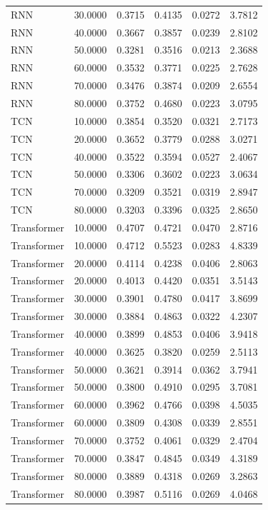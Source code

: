 \begin{tabular}{lrrrrr}
RNN & 30.0000 & 0.3715 & 0.4135 & 0.0272 & 3.7812 \\
RNN & 40.0000 & 0.3667 & 0.3857 & 0.0239 & 2.8102 \\
RNN & 50.0000 & 0.3281 & 0.3516 & 0.0213 & 2.3688 \\
RNN & 60.0000 & 0.3532 & 0.3771 & 0.0225 & 2.7628 \\
RNN & 70.0000 & 0.3476 & 0.3874 & 0.0209 & 2.6554 \\
RNN & 80.0000 & 0.3752 & 0.4680 & 0.0223 & 3.0795 \\
TCN & 10.0000 & 0.3854 & 0.3520 & 0.0321 & 2.7173 \\
TCN & 20.0000 & 0.3652 & 0.3779 & 0.0288 & 3.0271 \\
TCN & 40.0000 & 0.3522 & 0.3594 & 0.0527 & 2.4067 \\
TCN & 50.0000 & 0.3306 & 0.3602 & 0.0223 & 3.0634 \\
TCN & 70.0000 & 0.3209 & 0.3521 & 0.0319 & 2.8947 \\
TCN & 80.0000 & 0.3203 & 0.3396 & 0.0325 & 2.8650 \\
Transformer & 10.0000 & 0.4707 & 0.4721 & 0.0470 & 2.8716 \\
Transformer & 10.0000 & 0.4712 & 0.5523 & 0.0283 & 4.8339 \\
Transformer & 20.0000 & 0.4114 & 0.4238 & 0.0406 & 2.8063 \\
Transformer & 20.0000 & 0.4013 & 0.4420 & 0.0351 & 3.5143 \\
Transformer & 30.0000 & 0.3901 & 0.4780 & 0.0417 & 3.8699 \\
Transformer & 30.0000 & 0.3884 & 0.4863 & 0.0322 & 4.2307 \\
Transformer & 40.0000 & 0.3899 & 0.4853 & 0.0406 & 3.9418 \\
Transformer & 40.0000 & 0.3625 & 0.3820 & 0.0259 & 2.5113 \\
Transformer & 50.0000 & 0.3621 & 0.3914 & 0.0362 & 3.7941 \\
Transformer & 50.0000 & 0.3800 & 0.4910 & 0.0295 & 3.7081 \\
Transformer & 60.0000 & 0.3962 & 0.4766 & 0.0398 & 4.5035 \\
Transformer & 60.0000 & 0.3809 & 0.4308 & 0.0339 & 2.8551 \\
Transformer & 70.0000 & 0.3752 & 0.4061 & 0.0329 & 2.4704 \\
Transformer & 70.0000 & 0.3847 & 0.4845 & 0.0349 & 4.3189 \\
Transformer & 80.0000 & 0.3889 & 0.4318 & 0.0269 & 3.2863 \\
Transformer & 80.0000 & 0.3987 & 0.5116 & 0.0269 & 4.0468 \\
\bottomrule
\end{tabular}
